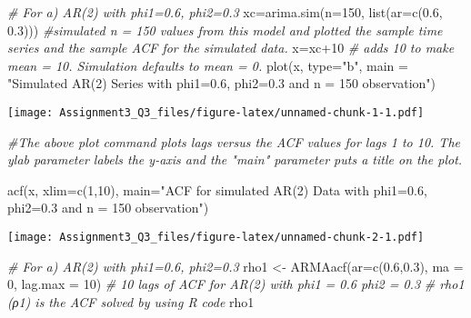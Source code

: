 \documentclass[
]{article}
\newenvironment{Shaded}{\begin{snugshade}}{\end{snugshade}}
\newcommand{\AttributeTok}[1]{\textcolor[rgb]{0.77,0.63,0.00}{#1}}
\newcommand{\CommentTok}[1]{\textcolor[rgb]{0.56,0.35,0.01}{\textit{#1}}}
\newcommand{\DecValTok}[1]{\textcolor[rgb]{0.00,0.00,0.81}{#1}}
\newcommand{\FloatTok}[1]{\textcolor[rgb]{0.00,0.00,0.81}{#1}}
\newcommand{\FunctionTok}[1]{\textcolor[rgb]{0.00,0.00,0.00}{#1}}
\newcommand{\NormalTok}[1]{#1}
\newcommand{\OtherTok}[1]{\textcolor[rgb]{0.56,0.35,0.01}{#1}}
\newcommand{\SpecialCharTok}[1]{\textcolor[rgb]{0.00,0.00,0.00}{#1}}
\newcommand{\StringTok}[1]{\textcolor[rgb]{0.31,0.60,0.02}{#1}}
\begin{document}
\begin{Shaded}
\begin{Highlighting}[]
\CommentTok{\# For a) AR(2) with phi1=0.6, phi2=0.3}
\NormalTok{xc}\OtherTok{=}\FunctionTok{arima.sim}\NormalTok{(}\AttributeTok{n=}\DecValTok{150}\NormalTok{, }\FunctionTok{list}\NormalTok{(}\AttributeTok{ar=}\FunctionTok{c}\NormalTok{(}\FloatTok{0.6}\NormalTok{, }\FloatTok{0.3}\NormalTok{))) }
\CommentTok{\#simulated n = 150 values from this model and plotted the sample time series and the sample ACF for the simulated data.}
\NormalTok{x}\OtherTok{=}\NormalTok{xc}\SpecialCharTok{+}\DecValTok{10}               \CommentTok{\# adds 10 to make mean = 10. Simulation defaults to mean = 0.}
\FunctionTok{plot}\NormalTok{(x, }\AttributeTok{type=}\StringTok{"b"}\NormalTok{, }\AttributeTok{main =} \StringTok{"Simulated AR(2) Series with phi1=0.6, phi2=0.3 and n = 150 observation"}\NormalTok{) }
\end{Highlighting}
\end{Shaded}

\texttt{[image: Assignment3\_Q3\_files/figure-latex/unnamed-chunk-1-1.pdf]}

\begin{Shaded}
\begin{Highlighting}[]
\CommentTok{\#The above plot command plots lags versus the ACF values for lags 1 to 10. The ylab parameter labels the y{-}axis and the "main" parameter puts a title on the plot.}
\end{Highlighting}
\end{Shaded}

\begin{Shaded}
\begin{Highlighting}[]
\FunctionTok{acf}\NormalTok{(x, }\AttributeTok{xlim=}\FunctionTok{c}\NormalTok{(}\DecValTok{1}\NormalTok{,}\DecValTok{10}\NormalTok{), }\AttributeTok{main=}\StringTok{"ACF for simulated AR(2) Data with phi1=0.6, phi2=0.3 and n = 150 observation"}\NormalTok{)}
\end{Highlighting}
\end{Shaded}

\texttt{[image: Assignment3\_Q3\_files/figure-latex/unnamed-chunk-2-1.pdf]}

\begin{Shaded}
\begin{Highlighting}[]
\CommentTok{\# For a) AR(2) with phi1=0.6, phi2=0.3}
\NormalTok{rho1 }\OtherTok{\textless{}{-}} \FunctionTok{ARMAacf}\NormalTok{(}\AttributeTok{ar=}\FunctionTok{c}\NormalTok{(}\FloatTok{0.6}\NormalTok{,}\FloatTok{0.3}\NormalTok{), }\AttributeTok{ma =} \DecValTok{0}\NormalTok{, }\AttributeTok{lag.max =} \DecValTok{10}\NormalTok{) }\CommentTok{\# 10 lags of ACF for AR(2) with phi1 = 0.6 phi2 = 0.3}
\CommentTok{\# rho1 (ρ1) is the ACF solved by using R code}
\NormalTok{rho1}
\end{Highlighting}
\end{Shaded}
\end{document}
